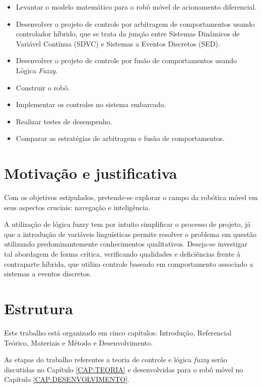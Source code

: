 	\begin{itemize}
	  \item Levantar o modelo matemático para o robô móvel de acionamento
	  diferencial.
	  \item Desenvolver o projeto de controle por arbitragem de comportamentos usando
	  controlador híbrido, que se trata da junção entre Sistemas Dinâmicos de Variável 
	  Contínua (SDVC) e Sistemas a Eventos Discretos (SED).
	  \item Desenvolver o projeto de controle por fusão de comportamentos usando Lógica 
	  \textit{Fuzzy}.
	  \item Construir o robô. 
	  \item Implementar os controles no sistema embarcado. 
	  \item Realizar testes de desempenho.
	  \item Comparar as estratégias de arbitragem e fusão de comportamentos. 
	\end{itemize}
	
\section{Motivação e justificativa}

Com os objetivos estipulados, pretende-se explorar o campo da robótica móvel em
seus aspectos cruciais: navegação e inteligência.

A utilização de lógica fuzzy tem por intuito simplificar o processo de
projeto, já que a introdução de variáveis linguísticas permite
resolver o problema em questão utilizando predominantemente conhecimentos
qualitativos. Deseja-se investigar tal abordagem de forma crítica, verificando
qualidades e deficiências frente à contraparte híbrida, que utiliza controle
baseado em comportamento associado a sistemas a eventos discretos.

\section{Estrutura}

Este trabalho está organizado em cinco capítulos: Introdução,
Referencial Teórico, Materiais e Método e Desenvolvimento. 

As etapas do trabalho referentes a teoria de controle e lógica \textit{fuzzy}
serão discutidas no Capítulo \ref{CAP:TEORIA} e desenvolvidas para o robô móvel 
no Capítulo \ref{CAP:DESENVOLVIMENTO}.
